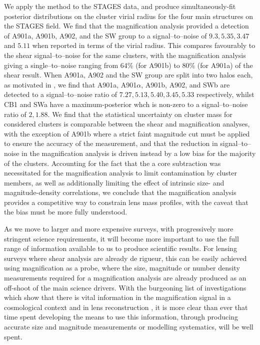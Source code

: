 \documentclass[useAMS,usenatbib,times,letter,amssymb]{mn2e}
\begin{document}
We apply the method to the STAGES data, and produce simultaneously-fit posterior distributions on the cluster virial radius for the four main structures on the STAGES field. We find that the magnification analysis provided a detection of A901a, A901b, A902, and the SW group to a signal--to--noise of $9.3, 5.35, 3.47$ and $5.11$ when reported in terms of the virial radius. This compares favourably to the shear signal--to--noise for the same clusters, with the magnification analysis giving a single--to--noise ranging from 64\% (for A901b) to 80\% (for A901a) of the shear result. When A901a, A902 and the SW group are split into two halos each, as motivated in \cite{Heymans:2008p2060}, we find that A901a, A901$\alpha$, A901b, A902, and SWb are detected to a signal--to--noise ratio of $7.27, 5.13, 5.40, 3.45, 5.33$ respectively, whilst CB1 and SWa have a maximum-posterior whch is non-zero to a signal--to--noise ratio of $2, 1.88$.  We find that the statistical uncertainty on cluster mass for considered clusters is comparable between the shear and magnification analyses, with the exception of A901b where a strict faint magnitude cut must be applied to ensure the accuracy of the measurement, and that the reduction in signal--to--noise in the magnification analysis is driven instead by a low bias for the majority of the clusters. Accounting for the fact that the a core subtraction was necessitated for the magnification analysis to limit contamination by cluster members, as well as additionally limiting the effect of intrinsic size- and magnitude-density correlations, we conclude that the magnification analysis provides a competitive way to constrain lens mass profiles, with the caveat that the bias must be more fully understood.

As we move to larger and more expensive surveys, with progressively more stringent science requirements, it will become more important to use the full range of information available to us to produce scientific results. For lensing surveys where shear analysis are already de rigueur, this can be easily achieved using magnification as a probe, where the size, magnitude or number density measurements required for a magnification analysis are already produced as an off-shoot of the main science drivers. With the burgeoning list of investigations which show that there is vital information in the magnification signal in a cosmological context \citep{Duncan:2014p2569,Alsing:2014p2846,Eifler:2013p2722,Gaztanaga:2012p1194,Eriksen:2015p2849} and in lens reconstruction \citep{Rozo:2010p1496,Schmidt:2012p1106,Ford:2014p2751,Ford:2014p2825,Bauer:2011p2066,Umetsu:2014p2726,Hildebrandt:2011p2755}, it is more clear than ever that time spent developing the means to use this information, through producing accurate size and magnitude measurements or modelling systematics, will be well spent.
\end{document}
